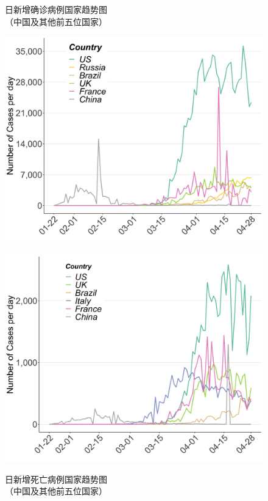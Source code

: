 \documentclass[]{article}
\begin{document}
\begin{figure}[H]
\centering
\begin{minipage}[b]{0.48\linewidth}
\caption{日新增确诊病例国家趋势图\\（中国及其他前五位国家）}
\includegraphics[]{./input/covid2.png}
\label{}
\end{minipage}
\quad
\begin{minipage}[b]{0.48\linewidth}
\caption{日新增死亡病例国家趋势图\\（中国及其他前五位国家） }
\includegraphics[]{./input/covid3.png}
\label{}
\end{minipage}
\end{figure}
\end{document}
